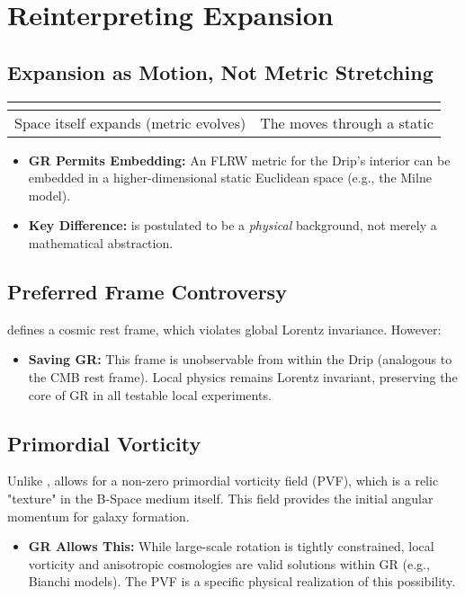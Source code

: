 \documentclass{BSpacePaper} %
\begin{document}
\section{Reinterpreting Expansion}

\subsection{Expansion as Motion, Not Metric Stretching}
\begin{center}
\begin{tabular}{ll}
\toprule
\textbf{\lcdm{}} & \textbf{\bspace{}} \\
\midrule
Space itself expands (metric evolves) & The \drip{} moves through a static \bspace{} \\
\bottomrule
\end{tabular}
\end{center}
\begin{itemize}
    \item \textbf{GR Permits Embedding:} An FLRW metric for the Drip's interior can be embedded in a higher-dimensional static Euclidean space (e.g., the Milne model).
    \item \textbf{Key Difference:} \bspace{} is postulated to be a \textit{physical} background, not merely a mathematical abstraction.
\end{itemize}

\subsection{Preferred Frame Controversy}
\bspace{} defines a cosmic rest frame, which violates global Lorentz invariance. However:
\begin{itemize}
    \item \textbf{Saving GR:} This frame is unobservable from within the Drip (analogous to the CMB rest frame). Local physics remains Lorentz invariant, preserving the core of GR in all testable local experiments.
\end{itemize}

\subsection{Primordial Vorticity}
Unlike \lcdm{}, \bspace{} allows for a non-zero primordial vorticity field (PVF), which is a relic "texture" in the B-Space medium itself. This field provides the initial angular momentum for galaxy formation.
\begin{itemize}
    \item \textbf{GR Allows This:} While large-scale rotation is tightly constrained, local vorticity and anisotropic cosmologies are valid solutions within GR (e.g., Bianchi models). The PVF is a specific physical realization of this possibility.
\end{itemize}
\end{document}
